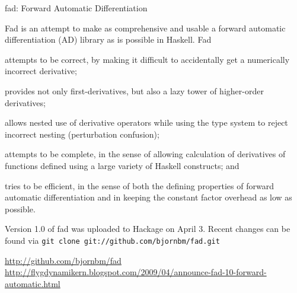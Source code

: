 \documentclass{article}
\begin{document}
\begin{hcarentry}{fad: Forward Automatic Differentiation}
\makeheader


Fad is an attempt to make as comprehensive and usable a forward
automatic differentiation (AD) library as is possible in Haskell.  Fad
\begin{inparaenum}[(a)]
\item attempts to be correct, by making it difficult to accidentally
  get a numerically incorrect derivative;
\item provides not only first-derivatives, but also a lazy tower of
  higher-order derivatives;
\item allows nested use of derivative operators while using the type
  system to reject incorrect nesting (perturbation confusion);
\item attempts to be complete, in the sense of allowing calculation of
  derivatives of functions defined using a large variety of Haskell
  constructs; and
\item tries to be efficient, in the sense of both the defining
  properties of forward automatic differentiation and in keeping the
  constant factor overhead as low as possible.
\end{inparaenum}


Version 1.0 of fad was uploaded to Hackage on April 3. Recent changes
can be found via \texttt{git clone git://github.com/bjornbm/fad.git}



\FurtherReading
  \url{http://github.com/bjornbm/fad}\\
  \url{http://flygdynamikern.blogspot.com/2009/04/announce-fad-10-forward-automatic.html}
\end{hcarentry}
\end{document}
